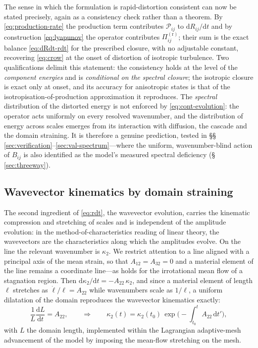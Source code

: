 \documentclass[lineno]{JFM-FLM_Au}
\begin{document}
The sense in which the formulation is rapid-distortion consistent can now
be stated precisely, again as a consistency check rather than a theorem.
By \eqref{eq:production-rate} the production term contributes
$\mathcal{P}_{ij}$ to $\mathrm{d}R_{ij}/\mathrm{d}t$ and by construction
\eqref{eq:lyapunov} the operator contributes $\Pi^{(\mathrm r)}_{ij}$;
their sum is the exact balance \eqref{eq:dRdt-rdt} for the prescribed
closure, with no adjustable constant, recovering \eqref{eq:crow} at the
onset of distortion of isotropic turbulence. Two qualifications delimit
this statement: the consistency holds at the level of the
\emph{component energies} and is \emph{conditional on the
spectral closure}; the isotropic closure is exact only at onset, and its
accuracy for anisotropic states is that of the
isotropisation-of-production approximation it reproduces. The
\emph{spectral} distribution of the distorted energy is not enforced by
\eqref{eq:cont-evolution}: the operator acts uniformly on every resolved
wavenumber, and the distribution of energy across scales emerges from
its interaction with diffusion, the cascade and the domain straining. It
is therefore a genuine prediction, tested in
\S\S\,\ref{sec:verification}--\ref{sec:val-spectrum}---where the
uniform, wavenumber-blind action of $B_{ij}$ is also identified as the
model's measured spectral deficiency (\S\,\ref{sec:threeway}).

\subsection{Wavevector kinematics by domain straining}
\label{sec:domain-strain}

The second ingredient of \eqref{eq:rdt}, the wavevector evolution, carries
the kinematic compression and stretching of scales and is independent of
the amplitude evolution: in the method-of-characteristics reading of
linear theory, the wavevectors are the characteristics along which the
amplitudes evolve. On the line the relevant wavenumber is $\kappa_2$. We
restrict attention to a line aligned with a principal axis of the mean
strain, so that $A_{12}=A_{32}=0$ and a material element of the line
remains a coordinate line---as holds for the irrotational mean flow of a
stagnation region. Then
$\mathrm{d}\kappa_2/\mathrm{d}t=-A_{22}\,\kappa_2$, and since a material
element of length $\ell$ stretches as $\dot\ell/\ell=A_{22}$ while
wavenumbers scale as $1/\ell$, a uniform dilatation of the domain
reproduces the wavevector kinematics exactly:
\begin{equation}
  \frac{1}{L}\frac{\mathrm{d}L}{\mathrm{d}t}=A_{22},
  \qquad\Longrightarrow\qquad
  \kappa_2(t)=\kappa_2(t_0)\,
  \exp\!\Big(\!-\!\int_{t_0}^{t}A_{22}\,\mathrm{d}t'\Big),
  \label{eq:dilatation}
\end{equation}
with $L$ the domain length, implemented within the Lagrangian
adaptive-mesh advancement of the model \citep{Lignell2013} by imposing
the mean-flow stretching on the mesh.
\end{document}
